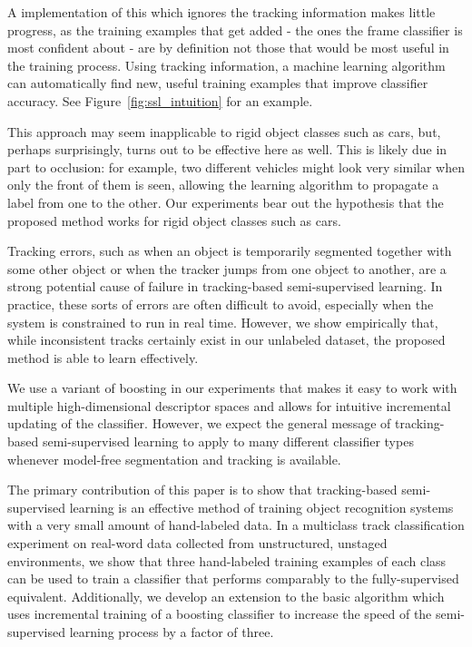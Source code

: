 \documentclass[conference]{IEEEtran}
\begin{document}
A \naive implementation of this which ignores the tracking information makes little progress, as the training examples that get added - the ones the frame classifier is most confident about - are by definition not those that would be most useful in the training process.  Using tracking information, a machine learning algorithm can automatically find new, useful training examples that improve classifier accuracy.  See Figure~\ref{fig:ssl_intuition} for an example.

This approach may seem inapplicable to rigid object classes such as cars, but, perhaps surprisingly, turns out to be effective here as well. This is likely due in part to occlusion: for example, two different vehicles might look very similar when only the front of them is seen, allowing the learning algorithm to propagate a label from one to the other.  Our experiments bear out the hypothesis that the proposed method works for rigid object classes such as cars.

Tracking errors, such as when an object is temporarily segmented together with some other object or when the tracker jumps from one object to another, are a strong potential cause of failure in tracking-based semi-supervised learning.  In practice, these sorts of errors are often difficult to avoid, especially when the system is constrained to run in real time.  However, we show empirically that, while inconsistent tracks certainly exist in our unlabeled dataset, the proposed method is able to learn effectively.

We use a variant of boosting in our experiments that makes it easy to work with multiple high-dimensional descriptor spaces and allows for intuitive incremental updating of the classifier.  However, we expect the general message of tracking-based semi-supervised learning to apply to many different classifier types whenever model-free segmentation and tracking is available.

The primary contribution of this paper is to show that tracking-based semi-supervised learning is an effective method of training object recognition systems with a very small amount of hand-labeled data.  In a multiclass track classification experiment on real-word data collected from unstructured, unstaged environments, we show that three hand-labeled training examples of each class can be used to train a classifier that performs comparably to the fully-supervised equivalent.  Additionally, we develop an extension to the basic algorithm which uses incremental training of a boosting classifier to increase the speed of the semi-supervised learning process by a factor of three.
\end{document}

